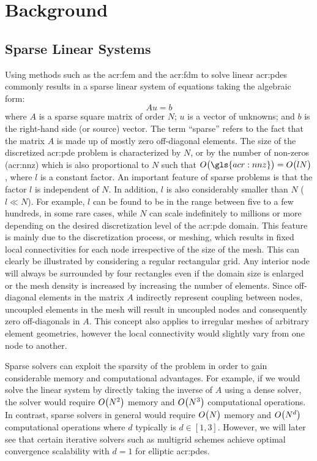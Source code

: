 \graphicspath{{./figs/Chp-Bg/}}

\chapter{Background}
\label{chp:bg}


\section{Sparse Linear Systems}

Using methods such as the \gls{acr:fem} and the \gls{acr:fdm} to solve linear \glspl{acr:pde} commonly results in a sparse linear system of equations taking the algebraic form:
\begin{equation}
	Au=b \label{eqn:aub}
\end{equation}
where $A$ is a sparse square matrix of order $N$; $u$ is a vector of unknowns; and $b$ is the right-hand side (or source) vector.
The term ``sparse'' refers to the fact that the matrix $A$ is made up of mostly zero off-diagonal elements.
The size of the discretized \gls{acr:pde} problem is characterized by $N$, or by the number of non-zeros (\gls{acr:nnz}) which is also proportional to $N$ such that $\bigo{\gls{acr:nnz}} = \bigo{lN}$, where $l$ is a constant factor.
An important feature of sparse problems is that the factor $l$ is independent of $N$.
In addition, $l$ is also considerably smaller than $N$ ($l \ll N$).
For example, $l$ can be found to be in the range between five to a few hundreds, in some rare cases, while $N$ can scale indefinitely to millions or more depending on the desired discretization level of the \gls{acr:pde} domain.
This feature is mainly due to the discretization process, or meshing, which results in fixed local connectivities for each node irrespective of the size of the mesh.
This can clearly be illustrated by considering a regular rectangular grid.
Any interior node will always be surrounded by four rectangles even if the domain size is enlarged or the mesh density is increased by increasing the number of elements.
Since off-diagonal elements in the matrix $A$ indirectly represent coupling between nodes, uncoupled elements in the mesh will result in uncoupled nodes and consequently zero off-diagonals in $A$.
This concept also applies to irregular meshes of arbitrary element geometries, however the local connectivity would slightly vary from one node to another.

Sparse solvers can exploit the sparsity of the problem in order to gain considerable memory and computational advantages.
For example, if we would solve the linear system  by directly taking the inverse of $A$ using a dense solver, the solver would require $ O\bigl(N^2\bigr)$ memory and $ O\bigl(N^3\bigr)$ computational operations.
In contrast, sparse solvers in general would require $ O\bigl(N\bigr)$ memory and $ O\bigl(N^d\bigr)$ computational operations where $d$ typically is $d \in [1, 3]$.
However, we will later see that certain iterative solvers such as multigrid schemes achieve optimal convergence scalability with $d=1$ for elliptic \glspl{acr:pde}.

